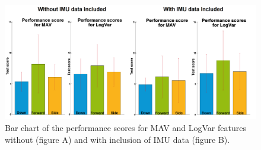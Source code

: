 \begin{figure}[H]
	\centering
	\includegraphics[width=1\textwidth]{figures/paperFigures/GotItTimeCol}  %
	\caption{Bar chart of the performance scores for MAV and LogVar features without (figure A) and with inclusion of IMU data (figure B).}
	\label{fig:GotItTimeCol}
\end{figure}
	
